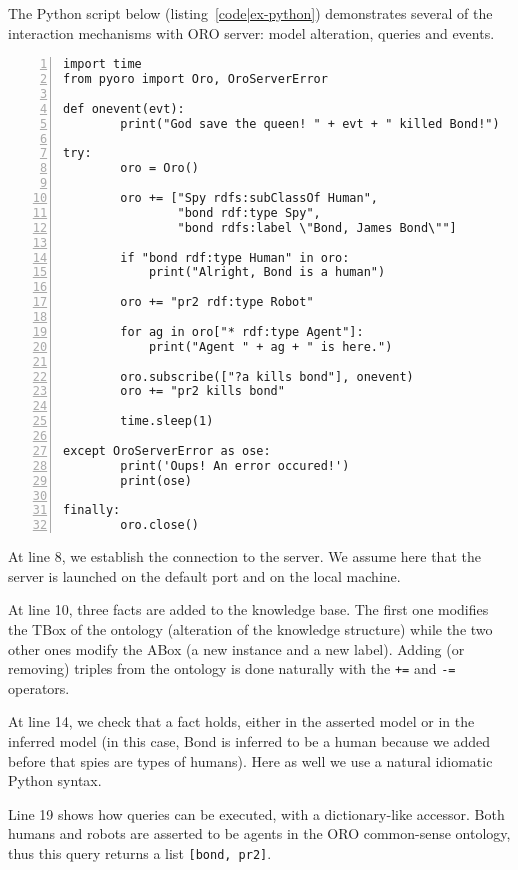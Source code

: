 The Python script below (listing~\ref{code|ex-python}) demonstrates several of
the interaction mechanisms with ORO server: model alteration, queries and events.

\lstset{language=python}
\begin{lstlisting}[numbers=left,
                   caption=Example of interaction with {\tt oro-server} in Python, 
                   label = code|ex-python,
                   morekeywords={as}]
import time
from pyoro import Oro, OroServerError

def onevent(evt):
        print("God save the queen! " + evt + " killed Bond!")

try:
        oro = Oro()

        oro += ["Spy rdfs:subClassOf Human", 
                "bond rdf:type Spy", 
                "bond rdfs:label \"Bond, James Bond\""]

        if "bond rdf:type Human" in oro:
            print("Alright, Bond is a human")

        oro += "pr2 rdf:type Robot"

        for ag in oro["* rdf:type Agent"]:
            print("Agent " + ag + " is here.")

        oro.subscribe(["?a kills bond"], onevent)
        oro += "pr2 kills bond"

        time.sleep(1)

except OroServerError as ose:
        print('Oups! An error occured!')
        print(ose)

finally:
        oro.close()
\end{lstlisting}

At line 8, we establish the connection to the server. We assume here that the
server is launched on the default port and on the local machine.

At line 10, three facts are added to the knowledge base. The first one modifies
the TBox of the ontology (alteration of the knowledge structure) while the two
other ones modify the ABox (a new instance and a new label). Adding (or
removing) triples from the ontology is done naturally with the {\tt +=} and
{\tt -=} operators.

At line 14, we check that a fact holds, either in the asserted model or in the
inferred model (in this case, Bond is inferred to be a human because we added
before that spies are types of humans). Here as well we use a natural idiomatic
Python syntax.

Line 19 shows how queries can be executed, with a dictionary-like accessor.
Both humans and robots are asserted to be agents in the ORO common-sense
ontology, thus this query returns a list {\tt [bond, pr2]}.

